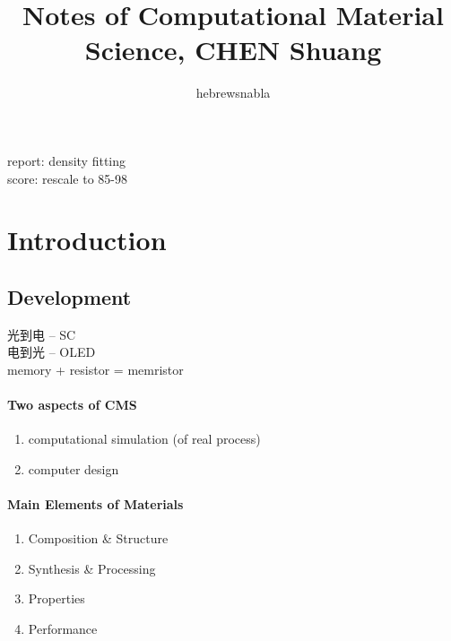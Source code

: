 \documentclass[a4paper]{article}
\title{Notes of \textbf{Computational Material Science}, CHEN Shuang}
\author{hebrewsnabla}
\numberwithin{equation}{section}
\begin{document}
\maketitle

\tableofcontents

\newpage

\setcounter{section}{0}
\section*{}
report: density fitting\\

score: rescale to 85-98\\

\section{Introduction}
\subsection{Development}
光到电 -- SC\\
电到光 -- OLED\\

memory + resistor = memristor\\

\paragraph{Two aspects of CMS}
\begin{enumerate}
	\item computational simulation (of real process)
	\item computer design
\end{enumerate}

\paragraph{Main Elements of Materials}
\begin{enumerate}
	\item Composition \& Structure
	\item Synthesis \& Processing
	\item Properties
	\item Performance
\end{enumerate}
\end{document}
